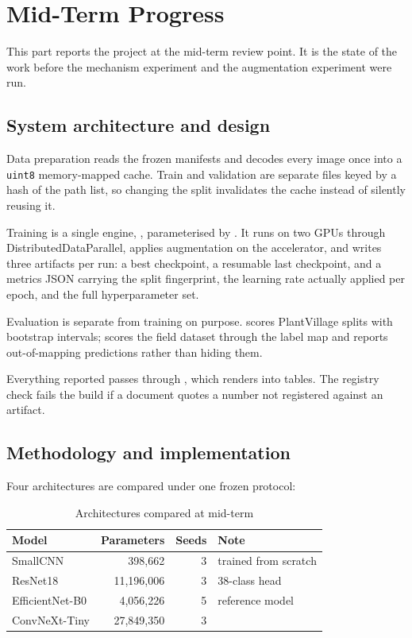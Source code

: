 \documentclass[12pt,a4paper]{report}
\newcommand{\tabfont}{\small}
\begin{document}
\chapter{Mid-Term Progress}

This part reports the project at the mid-term review point. It is the state of the
work before the mechanism experiment and the augmentation experiment were run.

\section{System architecture and design}

Data preparation reads the frozen manifests and decodes every image once into a
\texttt{uint8} memory-mapped cache. Train and validation are separate files keyed by
a hash of the path list, so changing the split invalidates the cache instead of
silently reusing it.

Training is a single engine, , parameterised by
. It runs on two GPUs through
DistributedDataParallel, applies augmentation on the accelerator, and writes three
artifacts per run: a best checkpoint, a resumable last checkpoint, and a metrics JSON
carrying the split fingerprint, the learning rate actually applied per epoch, and the
full hyperparameter set.

Evaluation is separate from training on purpose. 
scores PlantVillage splits with bootstrap intervals; 
scores the field dataset through the label map and reports out-of-mapping
predictions rather than hiding them.

Everything reported passes through , which
 renders into tables. The registry check fails the
build if a document quotes a number not registered against an artifact.

\section{Methodology and implementation}

Four architectures are compared under one frozen protocol:

\begin{table}[H]
\centering
\caption{Architectures compared at mid-term}
\label{tab:arch-mid}
\tabfont
\begin{tabularx}{\textwidth}{@{}lrrY@{}}
\toprule
\textbf{Model} & \textbf{Parameters} & \textbf{Seeds} & \textbf{Note} \\
\midrule
SmallCNN & 398,662 & 3 & trained from scratch \\
ResNet18 & 11,196,006 & 3 & 38-class head \\
EfficientNet-B0 & 4,056,226 & 5 & reference model \\
ConvNeXt-Tiny & 27,849,350 & 3 & \\
\bottomrule
\end{tabularx}
\end{table}
\end{document}
